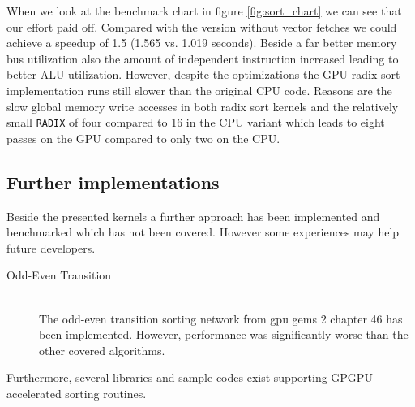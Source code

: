 When we look at the benchmark chart in figure \ref{fig:sort_chart} we can see that our effort paid off. Compared with the version without vector fetches we could achieve a speedup of 1.5 (1.565 vs. 1.019 seconds). Beside a far better memory bus utilization also the amount of independent instruction increased leading to better ALU utilization.
However, despite the optimizations the GPU radix sort implementation runs still slower than the original CPU code. Reasons are the slow global memory write accesses in both radix sort kernels and the relatively small \lstinline!RADIX! of four compared to 16 in the CPU variant which leads to eight passes on the GPU compared to only two on the CPU.


\subsection{Further implementations}
Beside the presented kernels a further approach has been implemented and benchmarked which has not been covered. However some experiences may help future developers.

\begin{description}
	\item[Odd-Even Transition \cite{gpu_gems_2_chapter_46}] \hfill \\
	The odd-even transition sorting network from gpu gems 2 chapter 46 has been implemented. However, performance was significantly worse than the other covered algorithms.
\end{description}

Furthermore, several libraries and sample codes exist supporting GPGPU accelerated sorting routines.

